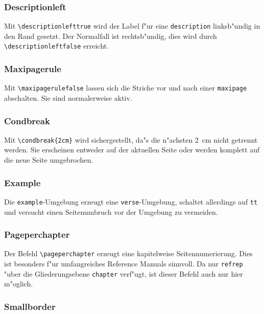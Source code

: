 \subsubsection{Descriptionleft}

Mit \verb|\descriptionlefttrue| wird der Label f"ur eine
\texttt{description} linksb"undig in den Rand gesetzt. Der Normalfall ist
rechtsb"undig, dies wird durch \verb|\descriptionleftfalse| erreicht.

\subsubsection{Maxipagerule}

Mit \verb|\maxipagerulefalse| lassen sich die Striche vor und nach 
einer \texttt{maxipage} abschalten. Sie sind normalerweise aktiv.

\subsubsection{Condbreak}

Mit \verb|\condbreak{2cm}| wird sichergestellt, da"s die n"achsten 2~cm 
nicht getrennt werden. Sie erscheinen entweder auf der aktuellen Seite 
oder werden komplett auf die neue Seite umgebrochen.

\subsubsection{Example}

Die \texttt{example}-Umgebung erzeugt eine \texttt{verse}-Umgebung, schaltet 
allerdings auf \texttt{tt} und versucht einen Seitenumbruch vor der 
Umgebung zu vermeiden.

\subsubsection{Pageperchapter}

Der Befehl \verb|\pageperchapter| erzeugt eine kapitelweise 
Seitennumerierung. Dies ist besonders f"ur umfangreiches 
Reference Manuals sinnvoll. Da nur \texttt{refrep} "uber die 
Gliederungsebene \texttt{chapter} verf"ugt, ist dieser Befehl 
auch nur hier m"oglich.

\subsubsection{Smallborder}

